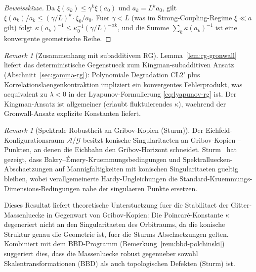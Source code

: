 \documentclass[12pt,a4paper]{article}
\theoremstyle{definition}
\theoremstyle{plain}
\theoremstyle{remark}
\newtheorem{remark}[definition]{Remark}
\begin{document}
\begin{proof}[Beweissk\"{i}zze]
Da $\xi(a_k) \leq \gamma^k \xi(a_0)$ und $a_k = L^k a_0$, gilt $\xi(a_k)/a_k \leq (\gamma/L)^k \cdot \xi_0/a_0$. Fuer $\gamma < L$ (was im Strong-Coupling-Regime $\xi \ll a$ gilt) folgt $\kappa(a_k)^{-1} \leq \kappa_0^{-1} (\gamma/L)^{-\alpha k}$, und die Summe $\sum_k \kappa(a_k)^{-1}$ ist eine konvergente geometrische Reihe.
\end{proof}

\begin{remark}[Zusammenhang mit subadditivem RG]\label{rem:gronwall-kingman}
Lemma~\ref{lem:rg-gronwall} liefert das deterministische Gegenstueck zum Kingman-subadditiven Ansatz (Abschnitt~\ref{sec:gamma-rg}): Polynomiale Degradation CL2' plus Korrelationslaengenkontraktion impliziert ein konvergentes Fehlerprodukt, was aequivalent zu $\lambda < 0$ in der Lyapunov-Formulierung \eqref{eq:lyapunov-rg} ist. Der Kingman-Ansatz ist allgemeiner (erlaubt fluktuierendes $\kappa$), waehrend der Gronwall-Ansatz explizite Konstanten liefert.
\end{remark}

\begin{remark}[Spektrale Robustheit an Gribov-Kopien (Sturm)]
\label{rem:sturm-gribov}
Der Eichfeld-Konfigurationsraum $\mathcal{A}/\mathcal{G}$ besitzt konische Singularitaeten an Gribov-Kopien -- Punkten, an denen die Eichbahn den Gribov-Horizont schneidet. Sturm~\cite{Sturm2025} hat gezeigt, dass Bakry--\'Emery-Kruemmungsbedingungen und Spektralluecken-Abschaetzungen auf Mannigfaltigkeiten mit konischen Singularitaeten gueltig bleiben, wobei verallgemeinerte Hardy-Ungleichungen die Standard-Kruemmungs-Dimensions-Bedingungen nahe der singulaeren Punkte ersetzen.

Dieses Resultat liefert theoretische Unterstuetzung fuer die Stabilitaet der Gitter-Massenluecke in Gegenwart von Gribov-Kopien: Die Poincar\'e-Konstante $\kappa$ degeneriert nicht an den Singularitaeten des Orbitraums, da die konische Struktur genau die Geometrie ist, fuer die Sturms Abschaetzungen gelten. Kombiniert mit dem BBD-Programm (Bemerkung~\ref{rem:bbd-polchinski}) suggeriert dies, dass die Massenluecke robust gegenueber sowohl Skalentransformationen (BBD) als auch topologischen Defekten (Sturm) ist.
\end{remark}
\end{document}

